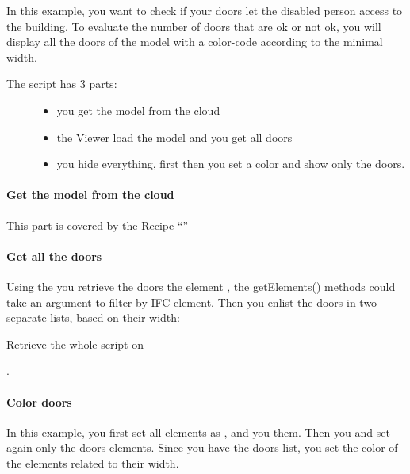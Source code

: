 \documentclass[a4paper,12pt,english]{sphinxmanual}
\begin{document}
In this example, you want to check if your doors let the disabled person access to the building.
To evaluate the number of doors that are ok or not ok, you will display all the doors of the model with a color-code according to the minimal width.
\begin{description}
\item[{The script has 3 parts:}] \leavevmode\begin{itemize}
\item {} 
you get the model from the cloud

\item {} 
the Viewer load the model and you get all doors

\item {} 
you hide everything, first then you set a color and show only the doors.

\end{itemize}

\end{description}


\paragraph{Get the model from the cloud}
\label{\detokenize{viewer/example_doors:get-the-model-from-the-cloud}}
This part is covered by the Recipe “{\hyperref[\detokenize{viewer/get_your_model_into_the_viewer::doc}]{}}”


\paragraph{Get all the doors}
\label{\detokenize{viewer/example_doors:get-all-the-doors}}
Using the  you retrieve the doors the element , the getElements() methods could take an argument to filter by IFC element.
Then you enlist the doors in two separate lists, based on their width:

Retrieve the whole script on %
\begin{footnote}[16]\sphinxAtStartFootnote
{}
%
\end{footnote}.


\paragraph{Color doors}
\label{\detokenize{viewer/example_doors:color-doors}}
In this example, you first set all elements as , and you  them. Then you  and set  again only the doors elements.
Since you have the doors list, you set the color of the elements related to their width.
\end{document}
